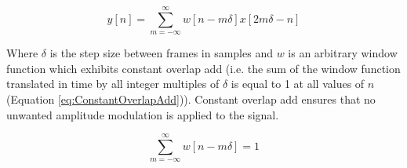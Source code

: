 		\begin{equation}
			y[n] = \sum_{m = -\infty}^{\infty} w[n - m\delta]x[2m\delta - n]
			\label{eq:STTR}
		\end{equation}

		Where $\delta$ is the step size between frames in samples and $w$ is an arbitrary window function which
		exhibits constant overlap add (i.e. the sum of the window function translated in time by all integer
		multiples of $\delta$ is equal to 1 at all values of $n$ (Equation \ref{eq:ConstantOverlapAdd})).  Constant
		overlap add ensures that no unwanted amplitude modulation is applied to the signal.

		\begin{equation}
			\sum_{m = -\infty}^{\infty} w[n - m\delta] = 1
			\label{eq:ConstantOverlapAdd}
		\end{equation}

